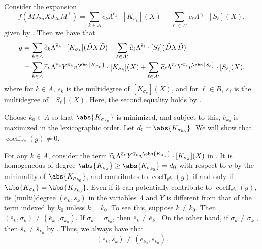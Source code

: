 \documentclass[10pt,a4paper]{amsart}
\DeclareMathOperator{\coeff}{coeff}
\begin{document}
\begin{pf}
Consider the expansion
\[
        f(M J_{2n} X J_{2n} M^\top) = \sum_{k \in A} \widetilde{c}_{k} \Lambda^{\overline{e}_k}\cdot [K_{\sigma_k}](X) + \sum_{\ell\in A'} \widetilde{c}_{\ell} \Lambda^{\overline{e}_\ell}\cdot [S_\ell](X),
\]
given by .
Then we have that
\begin{equation}\label{eq:expansion-g_pfaff}
\begin{aligned}
    g &= \sum_{k \in A} \widetilde{c}_{k} \Lambda^{\overline{e}_k}\cdot [K_{\sigma_k}](\widetilde{D} X \widetilde{D}) + \sum_{\ell\in A'} \widetilde{c}_{\ell} \Lambda^{\overline{e}_\ell}\cdot [S_\ell](\widetilde{D} X \widetilde{D}) \\
      &= \sum_{k \in A} \widetilde{c}_{k} \Lambda^{\overline{e}_k} Y^{\overline{s}_k} v^{\abs{K_{\sigma_k}}} \cdot [K_{\sigma_k}](X) + \sum_{\ell\in A'} \widetilde{c}_{\ell} \Lambda^{\overline{e}_\ell} Y^{\overline{s}_\ell} v^{\abs{S_\ell}} \cdot [S_\ell](X),
\end{aligned}
\end{equation}
where for $k\in A$, $\overline{s}_k$ is the multidegree of $[K_{\sigma_k}](X)$, and for $\ell \in B$, $\overline{s}_\ell$ is the multidegree of $[S_\ell](X)$.
Here, the second equality holds by .

Choose $k_0 \in A$ so that $\abs{K_{\sigma_{k_0}}}$ is minimized, and subject to this, $\overline{e}_{k_0}$ is maximized in the lexicographic order.
Let $d_0 = \abs{K_{\sigma_{k_0}}}$.
We will show that $\coeff_{v^{d_0}}(g)\neq 0$.


For any $k\in A$, consider the term $\widetilde{c}_{k} \Lambda^{\overline{e}_k} Y^{\overline{s}_k} v^{\abs{K_{\sigma_k}}} \cdot [K_{\sigma_k}](X)$ in .
It is homogeneous of degree $\abs{K_{\sigma_k}} \geq \abs{K_{\sigma_{k_0}}} = d_0$ with respect to $v$ by the minimality of $\abs{K_{\sigma_{k_0}}}$, and contributes to $\coeff_{v^{d_0}}(g)$ if and only if $\abs{K_{\sigma_k}} = \abs{K_{\sigma_{k_0}}}$.
Even if it can potentially contribute to $\coeff_{v^{d_0}}(g)$, its (multi)degree $(\overline{e}_k, \overline{s}_k)$ in the variables $\Lambda$ and $Y$ is different from that of the term indexed by $k_0$ unless $k = k_0$.
To see this, suppose $k \neq k_0$.
Then $(\overline{e}_k, \sigma_k) \neq (\overline{e}_{k_0} ,\sigma_{k_0})$.
If $\sigma_k = \sigma_{k_0}$, then $\overline{e}_k \neq \overline{e}_{k_0}$.
On the other hand, if $\sigma_k \neq \sigma_{k_0}$, then $\overline{s}_k \neq \overline{s}_{k_0}$ by .
Thus, we always have that
\[
    (\overline{e}_k, \overline{s}_k) \neq (\overline{e}_{k_0},\overline{s}_{k_0}).
\]


\end{pf}
\end{document}
